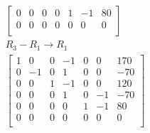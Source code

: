 \documentclass[12pt letter openany]{report}
\begin{document}
\begin{align*}
\begin{bmatrix}
    0  & 0  & 0 & 0  & 1 & -1 & 80  \\
    0  & 0  & 0 & 0  & 0 & 0  & 0   \\
  \end{bmatrix} \\
  R_3 - R_1  \rightarrow R_1      \\
  \begin{bmatrix}
    1 & 0  & 0 & -1 & 0 & 0  & 170 \\
    0 & -1 & 0 & 1  & 0 & 0  & -70 \\
    0 & 0  & 1 & -1 & 0 & 0  & 120 \\
    0 & 0  & 0 & 1  & 0 & -1 & -70 \\
    0 & 0  & 0 & 0  & 1 & -1 & 80  \\
    0 & 0  & 0 & 0  & 0 & 0  & 0   \\
  \end{bmatrix}
  \\
\end{align*}
\end{document}
